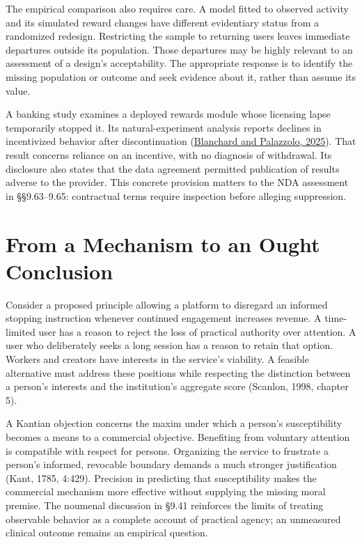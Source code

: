 The empirical comparison also requires care. A model fitted to observed
activity and its simulated reward changes have different evidentiary
status from a randomized redesign. Restricting the sample to returning
users leaves immediate departures outside its population. Those
departures may be highly relevant to an assessment of a design's
acceptability. The appropriate response is to identify the missing
population or outcome and seek evidence about it, rather than assume its
value.

A banking study examines a deployed rewards module whose licensing lapse
temporarily stopped it. Its natural-experiment analysis reports declines
in incentivized behavior after discontinuation
(\href{https://doi.org/10.1287/mksc.2023.0345}{Blanchard and Palazzolo,
2025}). That result concerns reliance on an incentive, with no diagnosis
of withdrawal. Its disclosure also states that the data agreement
permitted publication of results adverse to the provider. This concrete
provision matters to the NDA assessment in §§9.63--9.65: contractual
terms require inspection before alleging suppression.


\hypertarget{M09-from-a-mechanism-to-an-ought-conclusion}{%
\section{From a Mechanism to an Ought
Conclusion}\label{M09-from-a-mechanism-to-an-ought-conclusion}}

\noindent \noindent Consider a proposed principle allowing a platform to disregard
an informed stopping instruction whenever continued engagement increases
revenue. A time-limited user has a reason to reject the loss of
practical authority over attention. A user who deliberately seeks a long
session has a reason to retain that option. Workers and creators have
interests in the service's viability. A feasible alternative must
address these positions while respecting the distinction between a
person's interests and the institution's aggregate score (Scanlon, 1998,
chapter 5).

A Kantian objection concerns the maxim under which a person's
susceptibility becomes a means to a commercial objective. Benefiting
from voluntary attention is compatible with respect for persons.
Organizing the service to frustrate a person's informed, revocable
boundary demands a much stronger justification (Kant, 1785, 4:429).
Precision in predicting that susceptibility makes the commercial
mechanism more effective without supplying the missing moral premise.
The noumenal discussion in §9.41 reinforces the limits of treating
observable behavior as a complete account of practical agency; an
unmeasured clinical outcome remains an empirical question.

